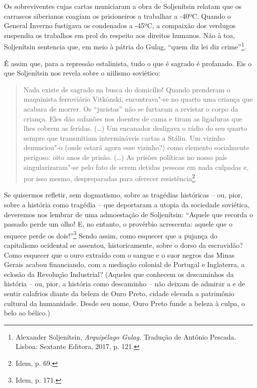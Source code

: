 Os sobreviventes cujas cartas municiaram a obra de Soljenítsin relatam
que os carrascos siberianos coagiam os prisioneiros a trabalhar a -40ºC.
Quando o General Inverno fustigava os condenados a -45ºC, a compaixão
dos verdugos suspendia os trabalhos em prol do respeito aos direitos
humanos. Não à toa, Soljenítsin sentencia que, em meio à pátria do
Gulag, ``quem diz lei diz crime''\footnote{Alexander Soljenítsin,
  \emph{Arquipélago Gulag.} Tradução de Antônio Pescada. Lisboa:
  Sextante Editora, 2017, p. 121.}.

É assim que, para a repressão estalinista, tudo o que é sagrado é
profanado. Eis o que Soljenítsin nos revela sobre o niilismo soviético:

\begin{quote}
Nada existe de sagrado na busca do domicílio! Quando prenderam o
maquinista ferroviário Vitkónski, encontrava"-se no quarto uma criança
que acabara de morrer. Os ``juristas'' não se furtaram a revistar o
corpo da criança. Eles dão safanões nos doentes de cama e tiram as
ligaduras que lhes cobrem as feridas. (\ldots{}) Um encanador desligava o
rádio do seu quarto sempre que transmitiam intermináveis cartas a
Stálin. Um vizinho denunciou"-o (onde estará agora esse vizinho?) como
elemento socialmente perigoso: oito anos de prisão. (\ldots{}) As prisões
políticas no nosso país singularizaram"-se pelo fato de serem detidas
pessoas em nada culpadas e, por isso mesmo, despreparadas para oferecer
resistência\footnote{Idem, p. 69.}.
\end{quote}

Se quisermos refletir, sem dogmatismo, sobre as tragédias históricas --
ou, pior, sobre a história como tragédia -- que deportaram a utopia da
sociedade soviética, deveremos nos lembrar de uma admoestação de
Soljenítsin: ``Aquele que recorda o passado perde um olho! E, no
entanto, o provérbio acrescenta: aquele que o esquece perde os
dois!''\footnote{Idem, p. 171.} Sendo assim, como esquecer que a pujança
do capitalismo ocidental se assentou, historicamente, sobre o dorso da
escravidão? Como esquecer que o ouro extraído com o sangue e o suor
negros das Minas Gerais acabou financiando, com a mediação colonial de
Portugal e Inglaterra, a eclosão da Revolução Industrial? (Aqueles que
conhecem os descaminhos da história -- ou, pior, a história como
descaminho -- não deixam de admirar a e de sentir calafrios diante da
beleza de Ouro Preto, cidade elevada a patrimônio cultural da
humanidade. Desde seu nome, Ouro Preto funde a beleza à culpa, o belo ao
bélico.)

